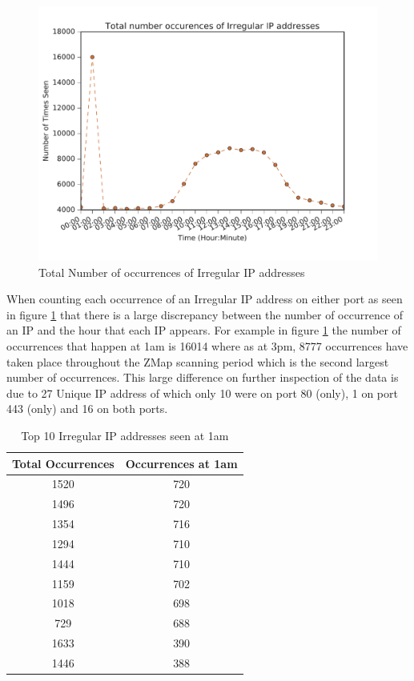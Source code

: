 \documentclass[a4wide,leqno,12pt]{report}
\begin{document}
\begin{figure}[H]
\centering
\includegraphics[scale=.5]{pdf_images/TotalNumberOccurencesOfIrregularIPaddressesOnAverage}
\caption{Total Number of occurrences of Irregular IP addresses }
\label{fig:irreg_occurence}
\end{figure}
When counting each occurrence of an Irregular IP address on either port as seen in figure \ref{fig:irreg_occurence} that there is a large discrepancy between the number of occurrence of an IP and the hour that each IP appears. For example in figure \ref{fig:irreg_occurence} the number of occurrences that happen at 1am is 16014 where as at 3pm, 8777 occurrences have taken place throughout the ZMap scanning period which is the second largest number of occurrences. This large difference on further inspection of the data is due to 27 Unique IP address of which only 10 were on port 80 (only), 1 on port 443 (only) and 16 on both ports.



\begin{table}[H]
\centering
\begin{tabular}{|| c c ||}
 \hline
  Total Occurrences & Occurrences at 1am  \\ [0.5ex]
 \hline\hline
 1520 & 720  \\
 1496 & 720 \\
 1354 & 716 \\
 1294 & 710  \\
 1444 & 710 \\
 1159 & 702 \\
 1018 & 698 \\
 729 & 688  \\
 1633 & 390 \\
 1446 & 388 \\[1ex]
 \hline
\end{tabular}
\caption{Top 10 Irregular IP addresses seen at 1am}
\label{table:2}
\end{table}
\end{document}
